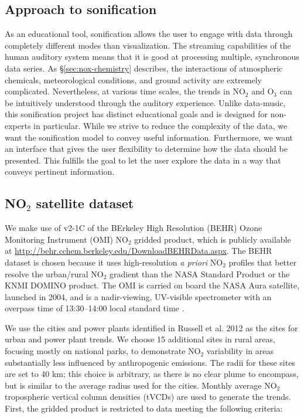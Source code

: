 \documentclass[a4paper,10pt,oneside]{article}
\newcommand{\ce}[1]{$\mathrm{#1}$}
\begin{document}
\begin{sloppy}
\section{Approach to sonification}
As an educational tool, sonification allows the user to engage with data through completely different modes than visualization. The streaming capabilities of the human auditory system means that it is good at processing multiple, synchronous data series. As \S \ref{sec:nox-chemistry} describes, the interactions of atmospheric chemicals, meteorological conditions, and ground activity are extremely complicated. Nevertheless, at various time scales, the trends in \ce{NO_2} and \ce{O_3} can be intuitively understood through the auditory experience. Unlike data-music, this sonification project has distinct educational goals and is designed for non-experts in particular. While we strive to reduce the complexity of the data, we want the sonification model to convey useful information.  Furthermore, we want an interface that gives the user flexibility to determine how the data should be presented.  This fulfills the goal to let the user explore the data in a way that conveys pertinent information.  

\subsection{NO$_2$ satellite dataset}
	We make use of v2-1C of the BErkeley High Resolution (BEHR) Ozone Monitoring Instrument (OMI) \ce{NO_2} gridded product, which is publicly available at \url{http://behr.cchem.berkeley.edu/DownloadBEHRData.aspx}. The BEHR dataset is chosen because it uses high-resolution \emph{a priori} \ce{NO_2} profiles that better resolve the urban/rural \ce{NO_2} gradient than the NASA Standard Product or the KNMI DOMINO product. The OMI is carried on board the NASA Aura satellite, launched in 2004, and is a nadir-viewing, UV-visible spectrometer with an overpass time of 13:30--14:00 local standard time \cite{levelt06}.
	
	We use the cities and power plants identified in Russell et al. 2012 \cite{russell12} as the sites for urban and power plant trends. We choose 15 additional sites in rural areas, focusing mostly on national parks, to demonstrate \ce{NO_2} variability in areas substantially less influenced by anthropogenic emissions. The radii for these sites are set to 40 km; this choice is arbitrary, as there is no clear plume to encompass, but is similar to the average radius used for the cities. Monthly average \ce{NO_2} tropospheric vertical column densities (tVCDs) are used to generate the trends. First, the gridded product is restricted to data meeting the following criteria:
	

\end{sloppy}
\end{document}

